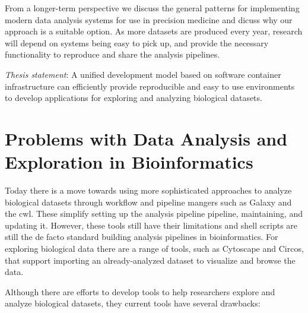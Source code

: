 From a longer-term perspective we discuss the general patterns for implementing
modern data analysis systems for use 
in precision medicine and dicuss why our
approach is a suitable option. As more datasets are produced every year,
research will depend on systems being 
easy to pick up, and provide the necessary
functionality to reproduce and share the analysis pipelines. 

\emph{Thesis statement}:
A unified development model based on software container infrastructure can
efficiently provide reproducible and easy to use environments to develop
applications for exploring and analyzing biological datasets. 

\section{Problems with Data Analysis and Exploration in Bioinformatics}
Today there is a move towards using more sophisticated approaches to analyze
biological datasets through workflow and pipeline mangers such as
Galaxy\cite{galaxy} and the \gls{cwl}\cite{cwl}. These simplify setting up the
analysis pipeline pipeline, maintaining, and updating it. However, these tools
still have their limitations and shell scripts are still the de facto standard
building analysis pipelines in bioinformatics. 
For exploring biological data there are a range of tools, such as
Cytoscape\cite{cytoscape} and Circos\cite{circos},
that support importing an already-analyzed dataset to visualize and browse the
data. 

Although there are efforts to develop tools to help researchers explore and
analyze biological datasets, they current tools have several drawbacks:

